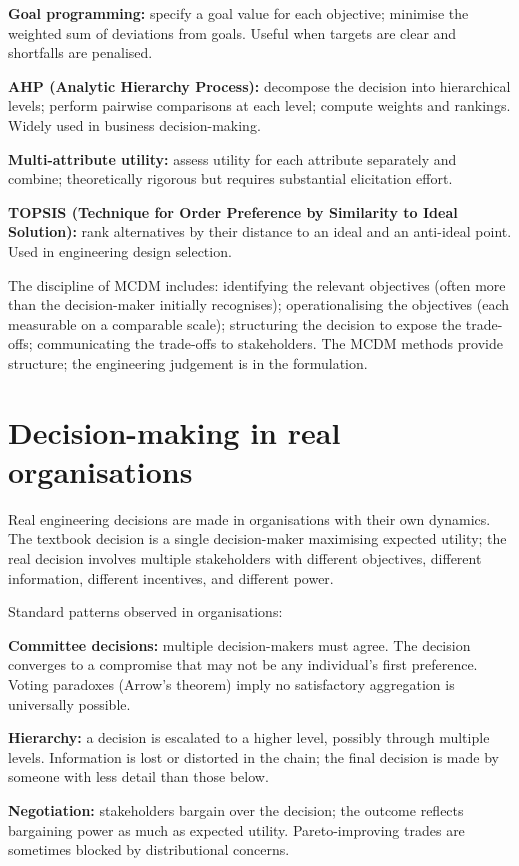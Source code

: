 \textbf{Goal programming:} specify a goal value for each objective; minimise the weighted sum of deviations from goals. Useful when targets are clear and shortfalls are penalised.

\textbf{AHP (Analytic Hierarchy Process):} decompose the decision into hierarchical levels; perform pairwise comparisons at each level; compute weights and rankings. Widely used in business decision-making.

\textbf{Multi-attribute utility:} assess utility for each attribute separately and combine; theoretically rigorous but requires substantial elicitation effort.

\textbf{TOPSIS (Technique for Order Preference by Similarity to Ideal Solution):} rank alternatives by their distance to an ideal and an anti-ideal point. Used in engineering design selection.

The discipline of MCDM includes: identifying the relevant objectives (often more than the decision-maker initially recognises); operationalising the objectives (each measurable on a comparable scale); structuring the decision to expose the trade-offs; communicating the trade-offs to stakeholders. The MCDM methods provide structure; the engineering judgement is in the formulation.

\section{Decision-making in real organisations}

Real engineering decisions are made in organisations with their own dynamics. The textbook decision is a single decision-maker maximising expected utility; the real decision involves multiple stakeholders with different objectives, different information, different incentives, and different power.

Standard patterns observed in organisations:

\textbf{Committee decisions:} multiple decision-makers must agree. The decision converges to a compromise that may not be any individual's first preference. Voting paradoxes (Arrow's theorem) imply no satisfactory aggregation is universally possible.

\textbf{Hierarchy:} a decision is escalated to a higher level, possibly through multiple levels. Information is lost or distorted in the chain; the final decision is made by someone with less detail than those below.

\textbf{Negotiation:} stakeholders bargain over the decision; the outcome reflects bargaining power as much as expected utility. Pareto-improving trades are sometimes blocked by distributional concerns.

